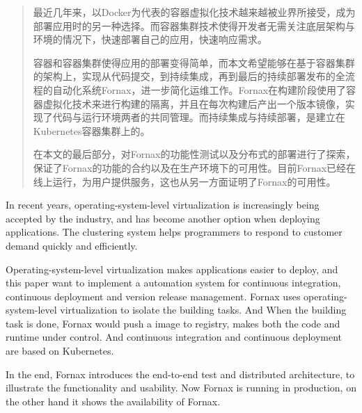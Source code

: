 
\begin{abstract}
\thispagestyle{front}

最近几年来，以Docker为代表的容器虚拟化技术越来越被业界所接受，成为部署应用时的另一种选择。而容器集群技术使得开发者无需关注底层架构与环境的情况下，快速部署自己的应用，快速响应需求。

容器和容器集群使得应用的部署变得简单，而本文希望能够在基于容器集群的架构上，实现从代码提交，到持续集成，再到最后的持续部署发布的全流程的自动化系统Fornax，进一步简化运维工作。Fornax在构建阶段使用了容器虚拟化技术来进行构建的隔离，并且在每次构建后产出一个版本镜像，实现了代码与运行环境两者的共同管理。而持续集成与持续部署，是建立在Kubernetes容器集群上的。

在本文的最后部分，对Fornax的功能性测试以及分布式的部署进行了探索，保证了Fornax的功能的合约以及在生产环境下的可用性。目前Fornax已经在线上运行，为用户提供服务，这也从另一方面证明了Fornax的可用性。

\end{abstract}

\begin{englishabstract}
\thispagestyle{front}

In recent years, operating-system-level virtualization is increasingly being accepted by the industry, and has become another option when deploying applications. The clustering system helps programmers to respond to customer demand quickly and efficiently.

Operating-system-level virtualization makes applications easier to deploy, and this paper want to implement a automation system for continuous integration, continuous deployment and version release management. Fornax uses operating-system-level virtualization to isolate the building tasks. And When the building task is done, Fornax would push a image to registry, makes both the code and runtime under control. And continuous integration and continuous deployment are based on Kubernetes.

In the end, Fornax introduces the end-to-end test and distributed architecture, to illustrate the functionality and usability. Now Fornax is running in production, on the other hand it shows the availability of Fornax.

\end{englishabstract}

